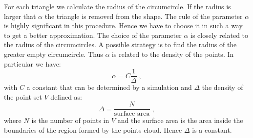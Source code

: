 For each triangle we calculate the radius of the circumcircle. If the radius is larger that $\alpha$ the triangle is removed from the shape. The rule of the parameter $\alpha$ is highly significant in this procedure. Hence we have to choose it in such a way to get a better approximation. The choice of the parameter $\alpha$ is closely related to the radius of the circumcircles. A possible strategy is to find the radius of the greater empty circumcircle. Thus $\alpha$ is related to the density of the points. In particular we have:
\begin{equation}
\alpha=C\frac{1}{\Delta}\;,
\end{equation}
with $C$ a constant that can be determined by a simulation and $\Delta$ the density of the point set $V$ defined as:
\begin{equation}
\Delta=\frac{N}{\mbox{surface area}}\; ,
\end{equation}
where $ N $ is the number of points in $V$ and the surface area is the area inside the boundaries of the region formed by the points cloud. Hence $\Delta$ is a constant.

